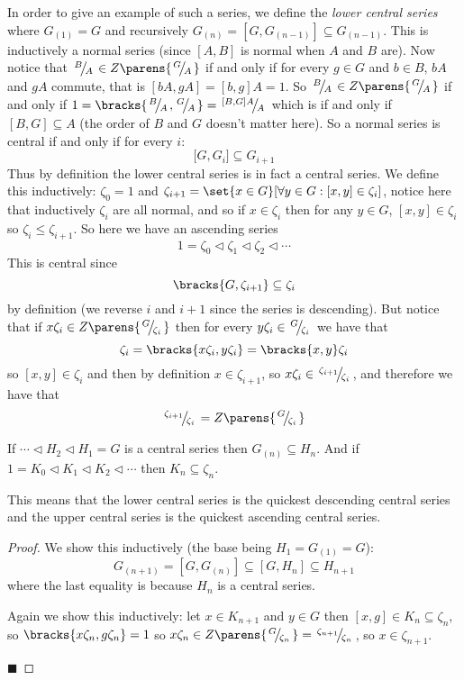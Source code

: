 \documentclass[10pt]{article}
\def\slfrac#1#2{\left.{}^{#1}\mkern-4mu\middle/\mkern-3mu{}_{#2}\right.}
\def\normal{\mathrel\triangleleft}
\begin{document}
In order to give an example of such a series, we define the \emph{lower central series} where $G_{(1)}=G$ and recursively $G_{(n)}=[G,G_{(n-1)}]\subseteq G_{(n-1)}$.
This is inductively a normal series (since $[A,B]$ is normal when $A$ and $B$ are).
Now notice that $\slfrac BA\in Z\parens{\slfrac GA}$ if and only if for every $g\in G$ and $b\in B$, $bA$ and $gA$ commute, that is $[bA,gA]=[b,g]A=1$.
So $\slfrac BA\in Z\parens{\slfrac GA}$ if and only if $1=\bracks{\slfrac BA,\slfrac GA}=\slfrac{[B,G]A}A$ which is if and only if $[B,G]\subseteq A$ (the order of $B$ and $G$ doesn't matter here).
So a normal series is central if and only if for every $i$:
\[ \bigl[G, G_i\bigr] \subseteq G_{i+1} \]
Thus by definition the lower central series is in fact a central series.
We define this inductively: $\zeta_0=1$ and $\zeta_{i+1}=\set{x\in G}[\forall y\in G: [x,y]\in\zeta_i]$, notice here that inductively $\zeta_i$ are all normal, and so if $x\in\zeta_i$ then for any $y\in G$,
$[x,y]\in\zeta_i$ so $\zeta_i\leq\zeta_{i+1}$.
So here we have an ascending series
\[ 1 = \zeta_0 \normal \zeta_1 \normal \zeta_2 \normal \cdots \]
This is central since
\[ \bracks{G, \zeta_{i+1}} \subseteq \zeta_i \]
by definition (we reverse $i$ and $i+1$ since the series is descending).
But notice that if $x\zeta_i\in Z\parens{\slfrac G{\zeta_i}}$ then for every $y\zeta_i\in\slfrac G{\zeta_i}$ we have that
\[ \zeta_i = \bracks{x\zeta_i, y\zeta_i} = \bracks{x,y}\zeta_i \]
so $[x,y]\in\zeta_i$ and then by definition $x\in\zeta_{i+1}$, so $x\zeta_i\in\slfrac{\zeta_{i+1}}{\zeta_i}$, and therefore we have that
\[ \slfrac{\zeta_{i+1}}{\zeta_i} = Z\parens{\slfrac G{\zeta_i}} \]

\begin{prop*}

    If $\cdots\normal H_2\normal H_1=G$ is a central series then $G_{(n)}\subseteq H_n$.
    And if $1=K_0\normal K_1\normal K_2\normal\cdots$ then $K_n\subseteq\zeta_n$.

\end{prop*}

This means that the lower central series is the quickest descending central series and the upper central series is the quickest ascending central series.

\begin{proof}

    We show this inductively (the base being $H_1=G_{(1)}=G$):
    \[ G_{(n+1)} = [G, G_{(n)}] \subseteq [G,H_n] \subseteq H_{n+1} \]
    where the last equality is because $H_n$ is a central series.

    Again we show this inductively: let $x\in K_{n+1}$ and $y\in G$ then $[x,g]\in K_n\subseteq\zeta_n$, so $\bracks{x\zeta_n,g\zeta_n}=1$ so
    $x\zeta_n\in Z\parens{\slfrac G{\zeta_n}}=\slfrac{\zeta_{n+1}}{\zeta_n}$, so $x\in\zeta_{n+1}$.

    \hfill$\blacksquare$

\end{proof}
\end{document}
